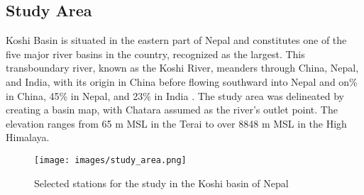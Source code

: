 \subsection{Study Area}
Koshi Basin is situated in the eastern part of Nepal and constitutes one of the five major river basins in the country, recognized as the largest. This transboundary river, known as the Koshi River, meanders through China, Nepal, and India, with its origin in China before flowing southward into Nepal and on\% in China, 45\% in Nepal, and 23\% in India \parencite{bastakoti_agriculture_2017}. The study area was delineated by creating a basin map, with Chatara assumed as the river's outlet point. The elevation ranges from 65 m MSL in the Terai to over 8848 m MSL in the High Himalaya.


\begin{figure}[H]  
  \centering
  \texttt{[image: images/study\_area.png]} 
  \caption{Selected stations for the study in the Koshi basin of Nepal}  
  \label{fig:study_area} 
\end{figure}



